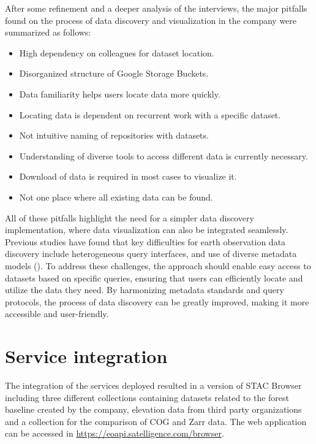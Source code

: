 \documentclass[
  oneside,
  open=any]{scrbook}
\providecommand{\tightlist}{%
  \setlength{\itemsep}{0pt}\setlength{\parskip}{0pt}}\usepackage{longtable,booktabs,array}
\begin{document}
After some refinement and a deeper analysis of the interviews, the major
pitfalls found on the process of data discovery and visualization in the
company were summarized as follows:

\begin{itemize}
\tightlist
\item
  High dependency on colleagues for dataset location.
\item
  Disorganized structure of Google Storage Buckets.
\item
  Data familiarity helps users locate data more quickly.
\item
  Locating data is dependent on recurrent work with a specific dataset.
\item
  Not intuitive naming of repositories with datasets.
\item
  Understanding of diverse tools to access different data is currently
  necessary.
\item
  Download of data is required in most cases to visualize it.
\item
  Not one place where all existing data can be found.
\end{itemize}

All of these pitfalls highlight the need for a simpler data discovery
implementation, where data visualization can also be integrated
seamlessly. Previous studies have found that key difficulties for earth
observation data discovery include heterogeneous query interfaces, and
use of diverse metadata models
(). To address these challenges, the approach should enable easy
access to datasets based on specific queries, ensuring that users can
efficiently locate and utilize the data they need. By harmonizing
metadata standards and query protocols, the process of data discovery
can be greatly improved, making it more accessible and user-friendly.

\section{Service integration}\label{service-integration}

The integration of the services deployed resulted in a version of STAC
Browser including three different collections containing datasets
related to the forest baseline created by the company, elevation data
from third party organizations and a collection for the comparison of
COG and Zarr data. The web application can be accessed in
\href{https://eoapi.satelligence.com/browser/?.language=en}{https://eoapi.satelligence.com/browser}.
\end{document}
